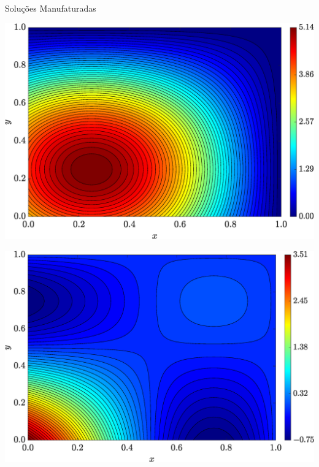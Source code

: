 \begin{frame}{Soluções Manufaturadas}
    \centering
    \captionsetup{justification=centering}
    \label{fig:sol_manufaturadas_31}
    \begin{minipage}{0.31\textwidth}
        \centering
        \includegraphics[width=\textwidth]{Figures/Exact_Map_NormErr_2nd_Betann_0.1_Re_1_Wi_1_epsilon_0_xi_0_alphaG_0_Dt_1e-06_at_0.05_tipsim_1_MMS_12_Txx.eps}
        \label{fig_solexaTxxCase11}
    \end{minipage}
    \hfill
    \begin{minipage}{0.31\textwidth}
        \centering
        \includegraphics[width=\textwidth]{Figures/Exact_Map_NormErr_2nd_Betann_0.1_Re_1_Wi_1_epsilon_0_xi_0_alphaG_0_Dt_1e-06_at_0.05_tipsim_1_MMS_12_Txy.eps}

\end{minipage}
\end{frame}
